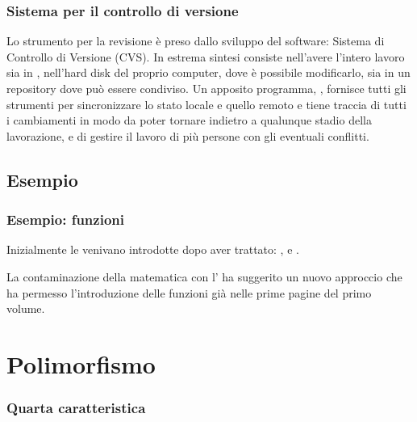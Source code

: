 \documentclass{beamer} %
\begin{document}
\begin{frame}\frametitle{Sistema per il controllo di versione}

Lo strumento per la revisione è preso dallo sviluppo del software: 
Sistema di Controllo di Versione (CVS).
\spause
In estrema sintesi consiste nell'avere l'intero lavoro sia in , 
nell'hard disk del proprio computer, dove è possibile modificarlo, sia 
in un repository  dove può essere condiviso. 
\spause
Un apposito programma, , fornisce tutti gli strumenti per 
sincronizzare lo stato locale e quello remoto e tiene traccia di tutti 
i cambiamenti in modo da poter tornare indietro a qualunque stadio della 
lavorazione, e di gestire il lavoro di più persone con gli eventuali 
conflitti.

\end{frame}


\subsection{Esempio} 

\begin{frame}\frametitle{Esempio: funzioni}

Inizialmente le  venivano introdotte dopo aver 
trattato: ,  e .

\pause
La contaminazione della matematica con l' ha suggerito 
un nuovo approccio che ha permesso l'introduzione delle funzioni 
già nelle prime pagine del primo volume.

\medskip
{}

\end{frame}


\section{Polimorfismo}


\begin{frame}\frametitle{Quarta caratteristica}

\begin{center}  \end{center}

\end{frame}
\end{document}
